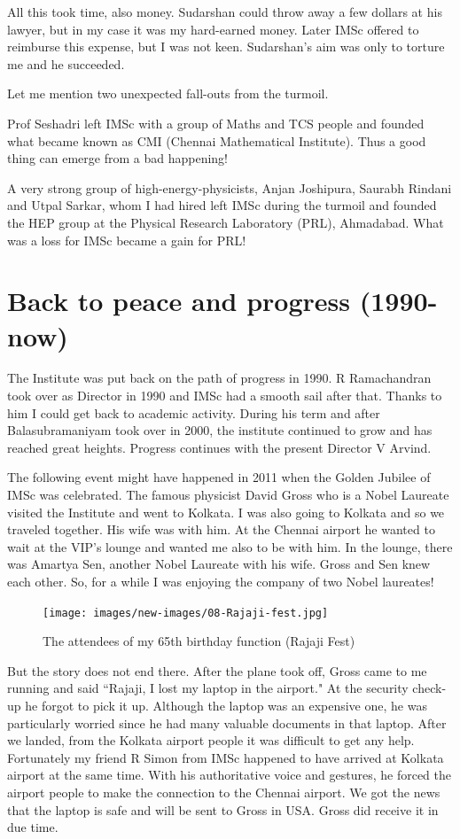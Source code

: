 All this took time, also money. Sudarshan could throw away a few dollars 
at his lawyer, but in my case it was my hard-earned money. Later IMSc 
offered to reimburse this expense, but I was not keen. Sudarshan's aim 
was only to torture me and he succeeded.

Let me mention two unexpected fall-outs from the turmoil.

Prof Seshadri left IMSc with a group of Maths and TCS people and founded 
what became known as CMI (Chennai Mathematical Institute). Thus a good 
thing can emerge from a bad happening!

A very strong group of high-energy-physicists, Anjan Joshi\-pura, Saurabh 
Rindani and Utpal Sarkar, whom I had hired left IMSc during the turmoil 
and founded the HEP group at the Physi\-cal Research Laboratory 
(PRL), Ahmadabad. What was a loss for IMSc became a gain for PRL!

\vspace{-\topsep}
\section*{Back to peace and progress (1990-now)}

The Institute was put back on the path of progress in 1990. R 
Ramachandran took over as Director in 1990 and IMSc had a smooth sail 
after that. Thanks to him I could get back to academic activity. During 
his term and after Balasubramaniyam took over in 2000, the institute 
continued to grow and has rea\-ched great heights. Progress continues with 
the present Director V Arvind.

The following event might have happened in 2011 when the Golden Jubilee 
of IMSc was celebrated. The famous physicist David Gross who is a Nobel 
Laureate visited the Institute and went to Kolkata. I was also going to 
Kolkata and so we trave\-led together. His wife was with him. At the 
Chennai airport he wanted to wait at the VIP's lounge and wanted me also 
to be with him. In the lounge, there was Amartya Sen, another Nobel 
Laureate with his wife. Gross and Sen knew each other. So, for a while I 
was enjoying the company of two Nobel laureates!

\begin{figure}[H]
\centering
\texttt{[image: images/new-images/08-Rajaji-fest.jpg]}
\caption{\small{The attendees of my 65th birthday function (Rajaji Fest)}}
\end{figure}

But the story does not end there. After the plane took off, Gross came 
to me running and said ``Rajaji, I lost my laptop in the airport." At the 
security check-up he forgot to pick it up. Although the laptop was an 
expensive one, he was particularly worried since he had many valuable 
documents in that laptop. After we landed, from the Kolkata airport 
people it was difficult to get any help. Fortunately my friend R Simon 
from IMSc ha\-ppened to have arrived at Kolkata airport at the same time. 
With his authoritative voice and gestures, he forced the airport people 
to make the connection to the Chennai airport. We got the news that the 
laptop is safe and will be sent to Gross in USA. Gross did receive it in 
due time.
\newpage

